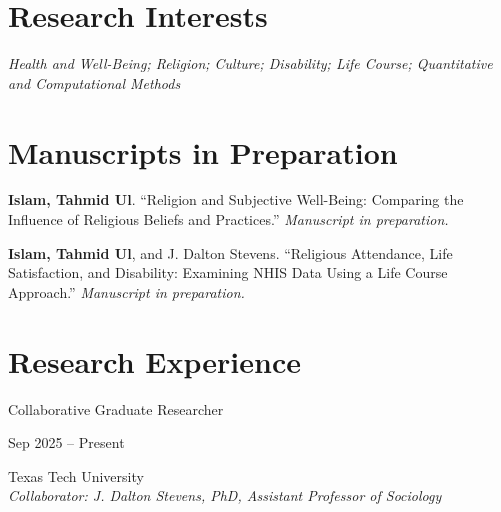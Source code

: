 \documentclass[letterpaper,10pt]{article}
\begin{document}
    \section{Research Interests}
    \textit{
        Health and Well-Being; Religion; Culture; Disability; Life Course; Quantitative and Computational Methods
    }

    \vspace{0.65em}

    \section{Manuscripts in Preparation}
    \textbf{Islam, Tahmid Ul}. ``Religion and Subjective Well-Being: Comparing the Influence of Religious Beliefs and Practices.''
    \textit{Manuscript in preparation.}\par
    \vspace{5pt}

    \textbf{Islam, Tahmid Ul}, and J. Dalton Stevens. ``Religious Attendance, Life Satisfaction, and Disability: Examining NHIS Data Using a Life Course Approach.''
    \textit{Manuscript in preparation.}\par

    \vspace{0.65em}

    \section{Research Experience}
    \begin{minipage} {.75\linewidth}
        \begin{flushleft}
            Collaborative Graduate Researcher
        \end{flushleft}
    \end{minipage}
    \hfill
    \begin{minipage} {.20\linewidth}
        \begin{flushright}
            Sep 2025 – Present
        \end{flushright}
    \end{minipage}
    Texas Tech University \\
    \textit{Collaborator: J. Dalton Stevens, PhD, Assistant Professor of Sociology} \\
    
\end{document}
